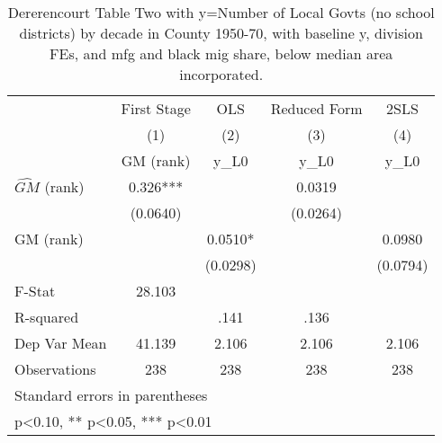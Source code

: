 \begin{table}[htbp]\centering
\def\sym#1{\ifmmode^{#1}\else\(^{#1}\)\fi}
\caption{Dererencourt Table Two with y=Number of Local Govts (no school districts) by decade in County 1950-70, with baseline y, division FEs, and mfg and black mig share, below median area incorporated.}
\begin{tabular}{l*{4}{c}}
\toprule
                    & First Stage   &         OLS   &Reduced Form   &        2SLS   \\
                    &\multicolumn{1}{c}{(1)}&\multicolumn{1}{c}{(2)}&\multicolumn{1}{c}{(3)}&\multicolumn{1}{c}{(4)}\\
                    &\multicolumn{1}{c}{GM  (rank)}&\multicolumn{1}{c}{y\_L0}&\multicolumn{1}{c}{y\_L0}&\multicolumn{1}{c}{y\_L0}\\
\midrule
$\hat{GM}$ (rank)   &       0.326***&               &      0.0319   &               \\
                    &    (0.0640)   &               &    (0.0264)   &               \\
\addlinespace
GM  (rank)          &               &      0.0510*  &               &      0.0980   \\
                    &               &    (0.0298)   &               &    (0.0794)   \\
\midrule
F-Stat              &      28.103   &               &               &               \\
R-squared           &               &        .141   &        .136   &               \\
Dep Var Mean        &      41.139   &       2.106   &       2.106   &       2.106   \\
Observations        &         238   &         238   &         238   &         238   \\
\bottomrule
\multicolumn{5}{l}{\footnotesize Standard errors in parentheses}\\
\multicolumn{5}{l}{\footnotesize * p<0.10, ** p<0.05, *** p<0.01}\\
\end{tabular}
\end{table}
